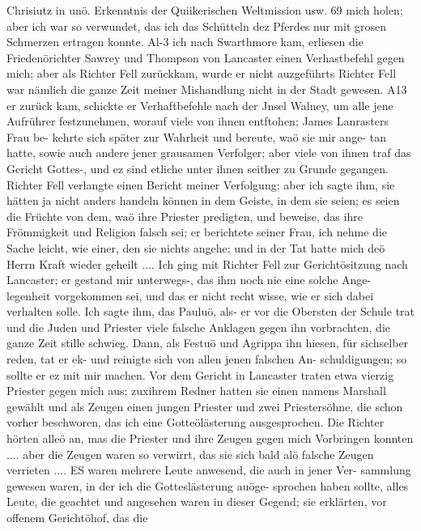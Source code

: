 Chrisiutz in unö. Erkenntnis der Quiikerischen Weltmission usw. 69
mich holen; aber ich war so verwundet, das ich das Schütteln
dez Pferdes nur mit grosen Schmerzen ertragen konnte. Al-3 ich
nach Swarthmore kam, erliesen die Friedenörichter Sawrey und
Thompson von Lancaster einen Verhastbefehl gegen mich; aber
als Richter Fell zurückkam, wurde er nicht auzgeführts Richter
Fell war nämlich die ganze Zeit meiner Mishandlung nicht in
der Stadt gewesen. A13 er zurück kam, schickte er Verhaftbefehle
nach der Jnsel Walney, um alle jene Aufrührer festzunehmen,
worauf viele von ihnen entftohen; James Lanrasters Frau be-
kehrte sich später zur Wahrheit und bereute, waö sie mir ange-
tan hatte, sowie auch andere jener grausamen Verfolger; aber
viele von ihnen traf das Gericht Gottes-, und ez sind etliche unter
ihnen seither zu Grunde gegangen. Richter Fell verlangte einen
Bericht meiner Verfolgung; aber ich sagte ihm, sie hätten ja nicht
anders handeln können in dem Geiste, in dem sie seien; es seien
die Früchte von dem, waö ihre Priester predigten, und beweise,
das ihre Frömmigkeit und Religion falsch sei; er berichtete seiner
Frau, ich nehme die Sache leicht, wie einer, den sie nichts angehe;
und in der Tat hatte mich deö Herrn Kraft wieder geheilt ....
Ich ging mit Richter Fell zur Gerichtösitzung nach Lancaster;
er gestand mir unterwegs-, das ihm noch nie eine solche Ange-
legenheit vorgekommen sei, und das er nicht recht wisse, wie
er sich dabei verhalten solle. Ich sagte ihm, das Pauluö, als-
er vor die Obersten der Schule trat und die Juden und Priester
viele falsche Anklagen gegen ihn vorbrachten, die ganze Zeit stille
schwieg. Dann, als Festuö und Agrippa ihn hiesen, für sichselber
reden, tat er ek- und reinigte sich von allen jenen falschen An-
schuldigungen; so sollte er ez mit mir machen. Vor dem Gericht
in Lancaster traten etwa vierzig Priester gegen mich aus; zuxihrem
Redner hatten sie einen namens Marshall gewählt und als
Zeugen einen jungen Priester und zwei Priestersöhne, die schon
vorher beschworen, das ich eine Gotteölästerung ausgesprochen.
Die Richter hörten alleö an, mas die Priester und ihre Zeugen
gegen mich Vorbringen konnten .... aber die Zeugen waren
so verwirrt, das sie sich bald alö falsche Zeugen verrieten ....
ES waren mehrere Leute anwesend, die auch in jener Ver-
sammlung gewesen waren, in der ich die Gotteslästerung auöge-
sprochen haben sollte, alles Leute, die geachtet und angesehen waren
in dieser Gegend; sie erklärten, vor offenem Gerichtöhof, das die


